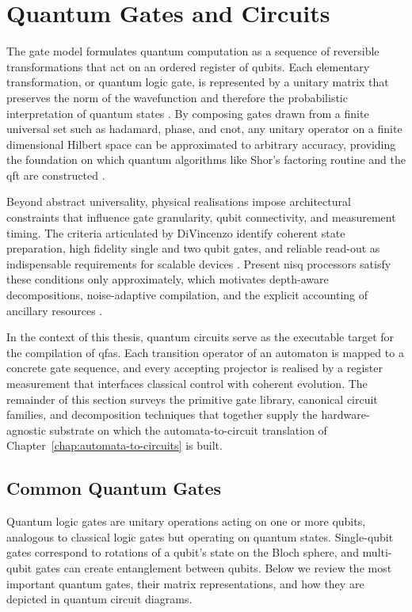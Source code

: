 \section{Quantum Gates and Circuits}
\label{sec:quantum-gates-and-circuits}

The gate model formulates quantum computation as a sequence of reversible transformations that act on an ordered register of qubits. Each elementary transformation, or quantum logic gate, is represented by a unitary matrix that preserves the norm of the wavefunction and therefore the probabilistic interpretation of quantum states \cite{NCFlips}. By composing gates drawn from a finite universal set such as \gls{hadamard},  \gls{phase}, and \gls{cnot}, any unitary operator on a finite dimensional Hilbert space can be approximated to arbitrary accuracy, providing the foundation on which quantum algorithms like Shor's factoring routine and the \gls{qft} are constructed \cite{Barenco1995elementary,Shor1994}.

Beyond abstract universality, physical realisations impose architectural constraints that influence gate granularity, qubit connectivity, and measurement timing. The criteria articulated by DiVincenzo identify coherent state preparation, high fidelity single and two qubit gates, and reliable read-out as indispensable requirements for scalable devices \cite{divincenzo2000criteria}. Present \gls{nisq} processors satisfy these conditions only approximately, which motivates depth-aware decompositions, noise-adaptive compilation, and the explicit accounting of ancillary resources \cite{Preskill2018nisq}. 

In the context of this thesis, quantum circuits serve as the executable target for the compilation of \glspl{qfa}. Each transition operator of an automaton is mapped to a concrete gate sequence, and every accepting projector is realised by a register measurement that interfaces classical control with coherent evolution. The remainder of this section surveys the primitive gate library, canonical circuit families, and decomposition techniques that together supply the hardware-agnostic substrate on which the automata-to-circuit translation of Chapter~\ref{chap:automata-to-circuits} is built.


\subsection{Common Quantum Gates}

Quantum logic gates are unitary operations acting on one or more qubits, analogous to classical logic gates but operating on quantum states.\cite{NielsenChuang2010} Single-qubit gates correspond to rotations of a qubit's state on the Bloch sphere, and multi-qubit gates can create entanglement between qubits.\cite{Barenco1995elementary} Below we review the most important quantum gates, their matrix representations, and how they are depicted in quantum circuit diagrams.\cite{Koch2022quantikz}

